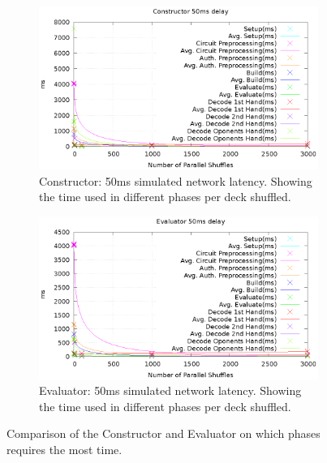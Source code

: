 \bigskip







\begin{figure}
    \label{fig:mesurement_ms}
    \centering

    \begin{subfigure}{\textwidth}
        \label{fig:const_ms_plot}
        \includegraphics[width=\textwidth]{figurs/const_ms_plot.eps}
        \caption{Constructor: 50ms simulated network latency. Showing the time used in different phases per deck shuffled.}
    \end{subfigure}

    \vspace*{1cm}

    \begin{subfigure}{\textwidth}
        \label{fig:eval_ms_plot}
        \includegraphics[width=\textwidth]{figurs/eval_ms_plot.eps}
        \caption{Evaluator: 50ms simulated network latency. Showing the time used in different phases per deck shuffled.}
    \end{subfigure}

\caption{Comparison of the Constructor and Evaluator on which phases requires the most time.}
\end{figure}

